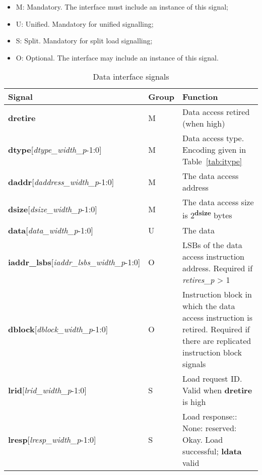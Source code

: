 \begin{itemize}
  \item M: Mandatory.  The interface must include an instance of this signal;
  \item U: Unified.  Mandatory for unified signalling;
  \item S: Split.  Mandatory for split load signalling;
  \item O: Optional.  The interface may include an instance of this signal.
\end{itemize}

\begin{table}[htp]
    \centering
    \caption{Data interface signals}
    \label{tab:data-ingress}
    \begin{tabulary}{\textwidth}{|l|l|p{80mm}|}
        \hline
        \textbf{Signal} & \textbf{Group} & \textbf{Function} \\
        \hline
        \textbf{dretire} & M & Data access retired (when high)\\
        \hline
        \textbf{dtype}[\textit{dtype\_width\_p}-1:0] & M & Data access type.  Encoding given in Table~\ref{tab:itype}\\
        \hline
        \textbf{daddr}[\textit{daddress\_width\_p}-1:0] & M & The data access address\\
        \hline
        \textbf{dsize}[\textit{dsize\_width\_p}-1:0] & M & The data access size is 2\textsuperscript{\textbf{dsize}} bytes\\
        \hline
        \textbf{data}[\textit{data\_width\_p}-1:0] & U & The data\\
        \hline
        \textbf{iaddr\_lsbs}[\textit{iaddr\_lsbs\_width\_p}-1:0] & O & LSBs of the data access instruction address.  Required if \textit{retires\_p} > 1\\
        \hline
        \textbf{dblock}[\textit{dblock\_width\_p}-1:0] & O & Instruction block in which the data access instruction is retired.  Required if there 
          are replicated instruction block signals\\
        \hline
        \textbf{lrid}[\textit{lrid\_width\_p}-1:0] & S & Load request ID. Valid when \textbf{dretire} is high\\
        \hline        
        \textbf{lresp}[\textit{lresp\_width\_p}-1:0] & S & Load response:: None: reserved: Okay.  Load successful; \textbf{ldata} valid\newline

\end{tabulary}
\end{table}
